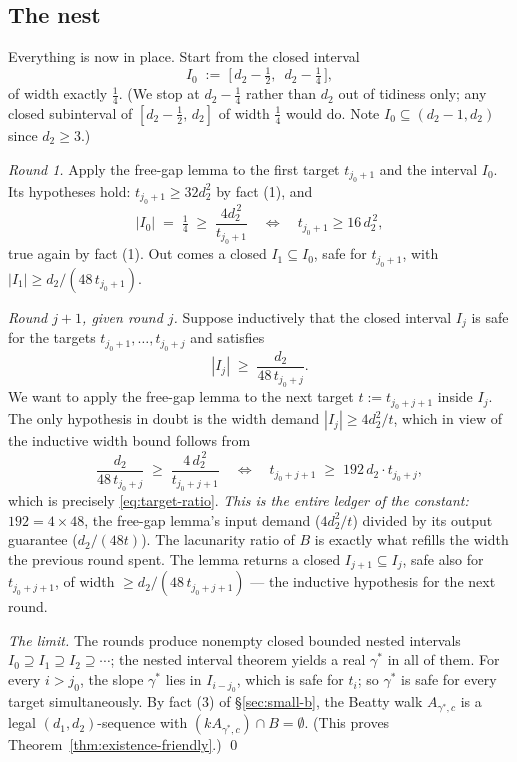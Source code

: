 \documentclass[11pt,reqno]{amsart}
\theoremstyle{plain}
\theoremstyle{definition}
\theoremstyle{remark}
\begin{document}
\subsection{The nest}

Everything is now in place. Start from the closed interval
\[
  I_0 \;:=\; \big[\, d_2 - \tfrac12,\ \; d_2 - \tfrac14 \,\big] ,
\]
of width exactly $\tfrac14$. (We stop at $d_2 - \tfrac14$ rather than $d_2$ out of
tidiness only; any closed subinterval of $[d_2 - \tfrac12,\, d_2]$ of width
$\tfrac14$ would do. Note $I_0 \subseteq (d_2 - 1, d_2)$ since $d_2 \ge 3$.)

\emph{Round 1.} Apply the free-gap lemma to the first target $t_{j_0+1}$ and the
interval $I_0$. Its hypotheses hold: $t_{j_0+1} \ge 32 d_2^2$ by fact (1), and
\[
  |I_0| \;=\; \tfrac14 \;\ge\; \frac{4 d_2^{\,2}}{t_{j_0+1}}
  \quad\Longleftrightarrow\quad t_{j_0+1} \ge 16\,d_2^{\,2} ,
\]
true again by fact (1). Out comes a closed $I_1 \subseteq I_0$, safe for
$t_{j_0+1}$, with $|I_1| \ge d_2/(48\,t_{j_0+1})$.

\emph{Round $j+1$, given round $j$.} Suppose inductively that the closed interval
$I_j$ is safe for the targets $t_{j_0+1}, \dots, t_{j_0+j}$ and satisfies
\[
  |I_j| \;\ge\; \frac{d_2}{48\, t_{j_0+j}} .
\]
We want to apply the free-gap lemma to the next target $t := t_{j_0+j+1}$ inside
$I_j$. The only hypothesis in doubt is the width demand $|I_j| \ge 4d_2^2/t$, which
in view of the inductive width bound follows from
\[
  \frac{d_2}{48\,t_{j_0+j}} \;\ge\; \frac{4\,d_2^{\,2}}{t_{j_0+j+1}}
  \quad\Longleftrightarrow\quad
  t_{j_0+j+1} \;\ge\; 192\,d_2 \cdot t_{j_0+j} ,
\]
which is precisely \eqref{eq:target-ratio}. \emph{This is the entire ledger of the
constant:} $192 = 4 \times 48$, the free-gap lemma's input demand ($4d_2^2/t$)
divided by its output guarantee ($d_2/(48t)$). The lacunarity ratio of $B$ is
exactly what refills the width the previous round spent. The lemma returns a closed
$I_{j+1} \subseteq I_j$, safe also for $t_{j_0+j+1}$, of width $\ge
d_2/(48\,t_{j_0+j+1})$ --- the inductive hypothesis for the next round.

\emph{The limit.} The rounds produce nonempty closed bounded nested intervals
$I_0 \supseteq I_1 \supseteq I_2 \supseteq \cdots$; the nested interval theorem
yields a real $\gamma^*$ in all of them. For every $i > j_0$, the slope $\gamma^*$
lies in $I_{i - j_0}$, which is safe for $t_i$; so $\gamma^*$ is safe for every
target simultaneously. By fact (3) of \S\ref{sec:small-b}, the Beatty walk
$A_{\gamma^*, c}$ is a legal $(d_1,d_2)$-sequence with
$(k A_{\gamma^*, c}) \cap B = \emptyset$. \hfill (This proves
Theorem~\ref{thm:existence-friendly}.) \qed
\end{document}
